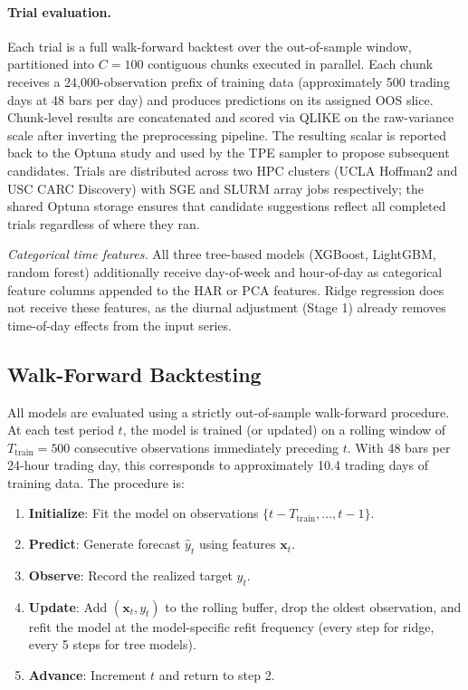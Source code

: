 \paragraph{Trial evaluation.}
Each trial is a full walk-forward backtest over the out-of-sample window, partitioned into $C=100$ contiguous chunks executed in parallel. Each chunk receives a 24{,}000-observation prefix of training data (approximately 500 trading days at 48 bars per day) and produces predictions on its assigned OOS slice. Chunk-level results are concatenated and scored via QLIKE on the raw-variance scale after inverting the preprocessing pipeline. The resulting scalar is reported back to the Optuna study and used by the TPE sampler to propose subsequent candidates. Trials are distributed across two HPC clusters (UCLA Hoffman2 and USC CARC Discovery) with SGE and SLURM array jobs respectively; the shared Optuna storage ensures that candidate suggestions reflect all completed trials regardless of where they ran.

\medskip

\noindent\textit{Categorical time features.} All three tree-based models (XGBoost, LightGBM, random forest) additionally receive day-of-week and hour-of-day as categorical feature columns appended to the HAR or PCA features. Ridge regression does not receive these features, as the diurnal adjustment (Stage 1) already removes time-of-day effects from the input series.

\subsection{Walk-Forward Backtesting}
\label{sec:backtest}

All models are evaluated using a strictly out-of-sample walk-forward procedure. At each test period $t$, the model is trained (or updated) on a rolling window of $T_{\mathrm{train}} = 500$ consecutive observations immediately preceding $t$. With 48 bars per 24-hour trading day, this corresponds to approximately 10.4 trading days of training data. The procedure is:

\begin{enumerate}
    \item \textbf{Initialize}: Fit the model on observations $\{t - T_{\mathrm{train}}, \ldots, t-1\}$.
    \item \textbf{Predict}: Generate forecast $\hat{y}_{t}$ using features $\mathbf{x}_t$.
    \item \textbf{Observe}: Record the realized target $y_t$.
    \item \textbf{Update}: Add $(\mathbf{x}_t, y_t)$ to the rolling buffer, drop the oldest observation, and refit the model at the model-specific refit frequency (every step for ridge, every 5 steps for tree models).
    \item \textbf{Advance}: Increment $t$ and return to step 2.
\end{enumerate}

